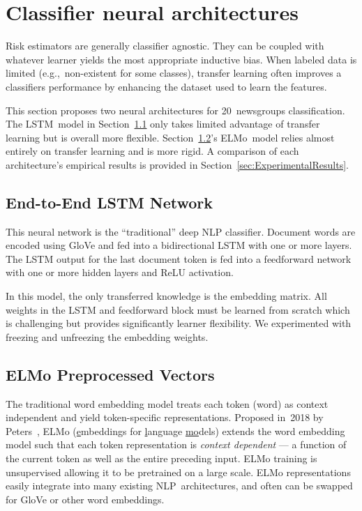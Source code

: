 \section{Classifier neural architectures}\label{sec:Architectures}

Risk estimators are generally classifier agnostic.  They can be coupled with whatever learner yields the most appropriate inductive bias. When labeled data is limited (e.g.,~non-existent for some classes), transfer learning often improves a classifiers performance by enhancing the dataset used to learn the features.

This section proposes two neural architectures for 20~newsgroups classification.  The LSTM~model in Section~\ref{sec:Architectures:LSTM} only takes limited advantage of transfer learning but is overall more flexible.  Section~\ref{sec:Architectures:ELMo}'s ELMo~model relies almost entirely on transfer learning and is more rigid. A comparison of each architecture's empirical results is provided in Section~\ref{sec:ExperimentalResults}.

\subsection{End-to-End LSTM Network}\label{sec:Architectures:LSTM}

This neural network is the ``traditional'' deep NLP classifier. Document words are encoded using GloVe and fed into a bidirectional LSTM with one or more layers.  The LSTM output for the last document token is fed into a feedforward network with one or more hidden layers and ReLU activation.

In this model, the only transferred knowledge is the embedding matrix. All weights in the LSTM and feedforward block must be learned from scratch which is challenging but provides significantly learner flexibility.  We experimented with freezing and unfreezing the embedding weights.

\subsection{ELMo Preprocessed Vectors}\label{sec:Architectures:ELMo}

The traditional word embedding model treats each token (word) as context independent and yield token-specific representations. Proposed in~2018 by Peters\etal~\cite{Peters:2018}, ELMo (\underline{e}mbeddings for \underline{l}anguage \underline{mo}dels) extends the word embedding model such that each token representation is \textit{context dependent} --- a function of the current token as well as the entire preceding input.  ELMo training is unsupervised allowing it to be pretrained on a large scale.  ELMo representations easily integrate into many existing NLP~architectures, and often can be swapped for GloVe or other word embeddings.

